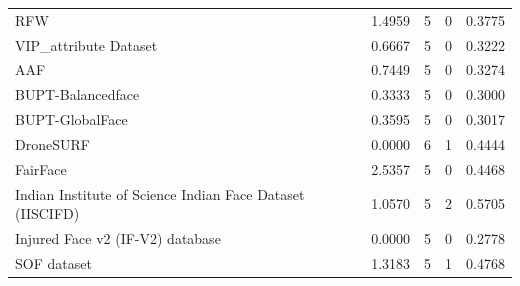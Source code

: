 \documentclass[journal]{IEEEtran}
\begin{document}
\begin{table}[!t]
\begin{tabular}{|p{}|C{0.11\textwidth}|C{0.11\textwidth}|C{0.11\textwidth}|C{0.11\textwidth}|}
RFW \cite{wang2019racial}                                                               & 1.4959                           & 5                               & 0                                  & 0.3775                    \\
VIP\_attribute Dataset \cite{dantcheva2018show}                                         & 0.6667                           & 5                               & 0                                  & 0.3222                    \\
AAF \cite{cheng2019exploiting}                                                          & 0.7449                           & 5                               & 0                                  & 0.3274                    \\
BUPT-Balancedface \cite{shi2020pv}                                                      & 0.3333                           & 5                               & 0                                  & 0.3000                    \\
BUPT-GlobalFace \cite{shi2020pv}                                                        & 0.3595                           & 5                               & 0                                  & 0.3017                    \\
DroneSURF \cite{kalra2019dronesurf}                                                     & 0.0000                           & 6                               & 1                                  & 0.4444                    \\
FairFace \cite{karkkainen2021fairface}                                                  & 2.5357                           & 5                               & 0                                  & 0.4468                    \\
Indian Institute of Science Indian Face Dataset (IISCIFD) \cite{katti2019you}           & 1.0570                           & 5                               & 2                                  & 0.5705                    \\
Injured Face v2 (IF-V2) database \cite{majumdar2019subclass}                            & 0.0000                           & 5                               & 0                                  & 0.2778                    \\
SOF dataset \cite{afifi2019afif4}                                                       & 1.3183                           & 5                               & 1                                  & 0.4768                    \\

\end{tabular}
\end{table}
\end{document}
